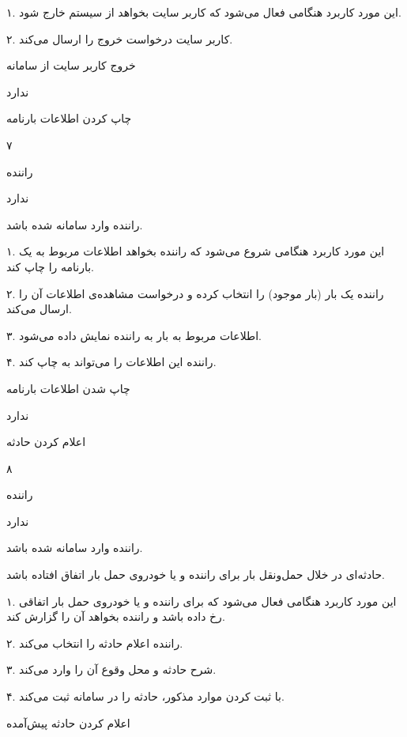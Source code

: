 
۱. این مورد کاربرد هنگامی فعال می‌شود که کاربر سایت بخواهد از سیستم خارج شود.

۲. کاربر سایت درخواست خروج را ارسال می‌کند.

خروج کاربر سایت از سامانه 

ندارد

\newpage

چاپ کردن اطلاعات بارنامه

۷

راننده

ندارد

راننده وارد سامانه شده باشد.


۱. این مورد کاربرد هنگامی شروع می‌شود که راننده بخواهد اطلاعات مربوط به یک بارنامه را چاپ کند. 

۲. راننده یک بار (بار موجود) را انتخاب کرده و درخواست مشاهده‌ی اطلاعات آن را ارسال می‌کند.

۳. اطلاعات مربوط به بار به راننده نمایش داده می‌شود.

۴. راننده این اطلاعات را می‌تواند به چاپ کند.

چاپ شدن اطلاعات بارنامه

ندارد

\newpage

اعلام کردن حادثه

۸

راننده

ندارد


راننده وارد سامانه شده باشد.

حادثه‌ای در خلال حمل‌و‌نقل بار برای راننده و یا خودروی حمل‌ بار اتفاق افتاده باشد.


۱. این مورد کاربرد هنگامی فعال می‌شود که برای راننده و یا خودروی حمل بار اتفاقی رخ داده باشد و  راننده بخواهد آن را گزارش کند.

۲. راننده اعلام حادثه را انتخاب می‌کند.

۳. شرح حادثه و محل وقوع آن را وارد می‌کند.

۴. با ثبت کردن موارد مذکور، حادثه را در سامانه ثبت می‌کند.

اعلام کردن حادثه پیش‌آمده


